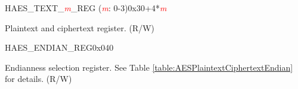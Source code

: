 \begin{register}{H}{AES\_TEXT\_\textcolor{red}{\it{m}}\_REG (\textcolor{red}{\it{m}}: 0-3)}{0x30+4*\textcolor{red}{\it{m}}}\label{regdesc:AESTEXTnREG}
%
\regnewline%
\begin{regdesc}\begin{reglist}
\item [AES\_TEXT\_\textcolor{red}{\it{m}}\_REG (\textcolor{red}{\it{m}}: 0-3)]Plaintext and ciphertext register. (R/W)
\end{reglist}\end{regdesc}
\end{register}


\begin{register}{H}{AES\_ENDIAN\_REG}{0x040}\label{regdesc:AESENDIANREG}
%
%
\regnewline%
\begin{regdesc}\begin{reglist}
\item [AES\_ENDIAN]Endianness selection register. See Table \ref{table:AESPlaintextCiphertextEndian} for details. (R/W)
\end{reglist}\end{regdesc}
\end{register}